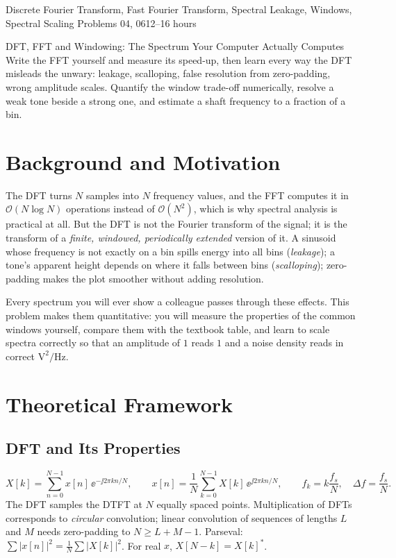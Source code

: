 \documentclass[11pt,a4paper]{article}
\begin{document}
%
{Discrete Fourier Transform, Fast Fourier Transform, Spectral Leakage, Windows, Spectral Scaling}%
{Problems 04, 06}{12--16 hours}

\begin{summarybox}{DFT, FFT and Windowing: The Spectrum Your Computer Actually Computes}
Write the FFT yourself and measure its speed-up, then learn every way the DFT misleads the unwary: leakage, scalloping, false resolution from zero-padding, wrong amplitude scales. Quantify the window trade-off numerically, resolve a weak tone beside a strong one, and estimate a shaft frequency to a fraction of a bin.
\end{summarybox}


\section*{Background and Motivation}
The DFT turns $N$ samples into $N$ frequency values, and the FFT computes it in $\mathcal O(N\log N)$ operations instead of $\mathcal O(N^2)$, which is why spectral analysis is practical at all. But the DFT is not the Fourier transform of the signal; it is the transform of a \emph{finite, windowed, periodically extended} version of it. A sinusoid whose frequency is not exactly on a bin spills energy into all bins (\emph{leakage}); a tone's apparent height depends on where it falls between bins (\emph{scalloping}); zero-padding makes the plot smoother without adding resolution.

Every spectrum you will ever show a colleague passes through these effects. This problem makes them quantitative: you will measure the properties of the common windows yourself, compare them with the textbook table, and learn to scale spectra correctly so that an amplitude of $1$ reads $1$ and a noise density reads in correct $\mathrm{V^2/Hz}$.

\section*{Theoretical Framework}
\subsection{DFT and Its Properties}
\begin{equation}
  X[k]=\sum_{n=0}^{N-1}x[n]\,\ee^{-\jj2\pi kn/N},\qquad x[n]=\frac1N\sum_{k=0}^{N-1}X[k]\,\ee^{\jj2\pi kn/N},\qquad f_k=k\frac{f_s}{N},\quad\Delta f=\frac{f_s}{N}.
  \label{eq:dft}
\end{equation}
The DFT samples the DTFT at $N$ equally spaced points. Multiplication of DFTs corresponds to \emph{circular} convolution; linear convolution of sequences of lengths $L$ and $M$ needs zero-padding to $N\ge L+M-1$. Parseval: $\sum|x[n]|^2=\frac1N\sum|X[k]|^2$. For real $x$, $X[N-k]=X[k]^\ast$.
\end{document}
